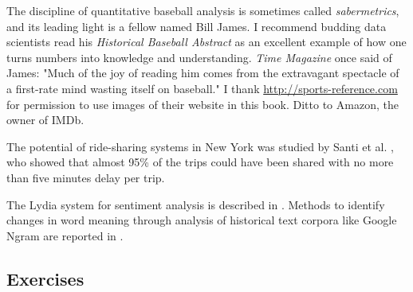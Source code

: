 \documentclass[10pt]{article}
\begin{document}
The discipline of quantitative baseball analysis is sometimes called \textit{sabermetrics}, and its leading light is a fellow named Bill James. I recommend budding data scientists read his \textit{Historical Baseball Abstract} \cite{Jam10} as an excellent example of how one turns numbers into knowledge and understanding. \textit{Time Magazine} once said of James: "Much of the joy of reading him comes from the extravagant spectacle of a first-rate mind wasting itself on baseball." I thank \href{http://sports-reference.com}{http://sports-reference.com} for permission to use images of their website in this book. Ditto to Amazon, the owner of IMDb.

The potential of ride-sharing systems in New York was studied by Santi et al. \cite{SRS+14}, who showed that almost 95\% of the trips could have been shared with no more than five minutes delay per trip.

The Lydia system for sentiment analysis is described in \cite{GSS07}. Methods to identify changes in word meaning through analysis of historical text corpora like Google Ngram are reported in \cite{KARPS15}.

\subsection{Exercises}
\end{document}
